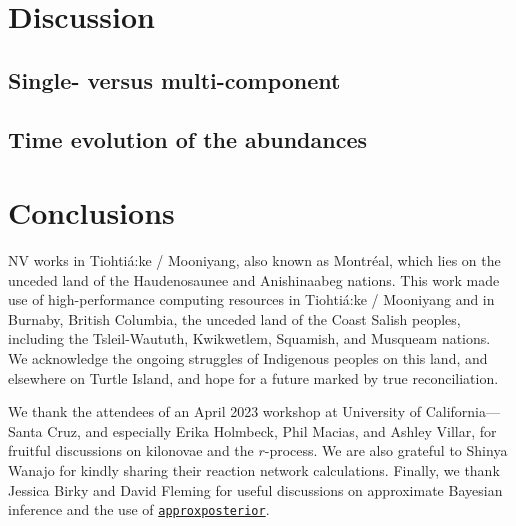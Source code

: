 \documentclass[twocolumn, twocolappendix]{aastex63}
\def\approxposterior{\texttt{approxposterior}}
\begin{document}

\section{Discussion}\label{sec:disco}


\subsection{Single- versus multi-component}


\subsection{Time evolution of the abundances}







\section{Conclusions}\label{sec:conco}



\acknowledgments


NV works in Tiohti{\'a}:ke / Mooniyang, also known as Montr{\'e}al, which lies on the unceded land of the Haudenosaunee and Anishinaabeg nations. This work made use of high-performance computing resources in Tiohti{\'a}:ke / Mooniyang and in Burnaby, British Columbia, the unceded land of the Coast Salish peoples, including the Tsleil-Waututh, Kwikwetlem, Squamish, and Musqueam nations. We acknowledge the ongoing struggles of Indigenous peoples on this land, and elsewhere on Turtle Island, and hope for a future marked by true reconciliation. 

We thank the attendees of an April 2023 workshop at University of California---Santa Cruz, and especially Erika Holmbeck, Phil Macias, and Ashley Villar, for fruitful discussions on kilonovae and the $r$-process. We are also grateful to Shinya Wanajo for kindly sharing their reaction network calculations. Finally, we thank Jessica Birky and David Fleming for useful discussions on approximate Bayesian inference and the use of \href{https://dflemin3.github.io/approxposterior/index.html}{\approxposterior}.
\end{document}
